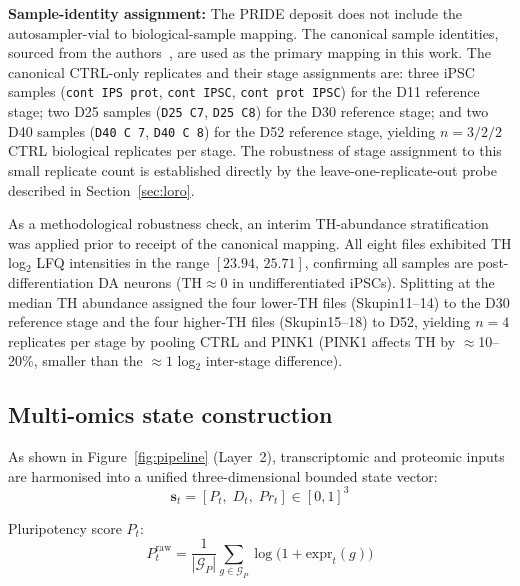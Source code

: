 \documentclass[5p,times,twocolumn]{elsarticle}
\begin{document}
\textbf{Sample-identity assignment:}
The PRIDE deposit does not include the autosampler-vial to
biological-sample mapping.
The canonical sample identities, sourced from the authors~\cite{novak2022single}, are used as the primary mapping in this work.
The canonical CTRL-only replicates and their stage
assignments are: three iPSC samples (\texttt{cont IPS prot},
\texttt{cont IPSC}, \texttt{cont prot IPSC}) for the D11
reference stage; two D25 samples (\texttt{D25 C7},
\texttt{D25 C8}) for the D30 reference stage; and two D40
samples (\texttt{D40 C 7}, \texttt{D40 C 8}) for the D52
reference stage, yielding $n = 3/2/2$ CTRL biological
replicates per stage.
The robustness of stage assignment to this small replicate
count is established directly by the leave-one-replicate-out
probe described in Section~\ref{sec:loro}.

As a methodological robustness check, an interim
TH-abundance stratification was applied prior to receipt
of the canonical mapping.
All eight files exhibited TH log$_{2}$ LFQ intensities in
the range $[23.94,\,25.71]$, confirming all samples are
post-differentiation DA neurons ($\text{TH} \approx 0$
in undifferentiated iPSCs).
Splitting at the median TH abundance assigned the four
lower-TH files (Skupin11--14) to the D30 reference stage
and the four higher-TH files (Skupin15--18) to D52,
yielding $n = 4$ replicates per stage by pooling CTRL and
PINK1 (PINK1 affects TH by $\approx$10--20\%, smaller than
the $\approx 1$ log$_{2}$ inter-stage difference).

\subsection{\textbf{Multi-omics state construction}}
\label{sec:state}

As shown in Figure~\ref{fig:pipeline} (Layer~2),
transcriptomic and proteomic inputs are harmonised into
a unified three-dimensional bounded state vector:
%
\begin{equation}
  \mathbf{s}_{t} = [P_{t},\; D_{t},\; Pr_{t}] \in [0,1]^{3}
  \label{eq:state}
\end{equation}

Pluripotency score $P_{t}$:
%
\begin{equation}
  P_{t}^{\text{raw}} =
    \frac{1}{|\mathcal{G}_{P}|}
    \sum_{g \in \mathcal{G}_{P}} \log\!\bigl(1 + \text{expr}_{t}(g)\bigr)
  \label{eq:P}
\end{equation}
\end{document}
